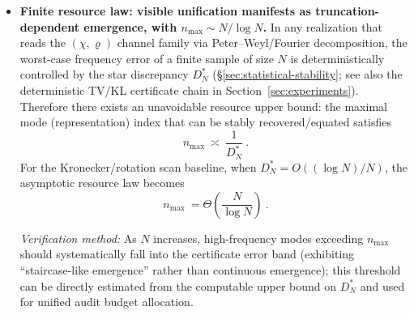 \begin{itemize}
  \item \textbf{Finite resource law: visible unification manifests as truncation-dependent emergence, with \(n_{\max}\sim N/\log N\).}
  In any realization that reads the \((\chi,\varrho)\) channel family via Peter--Weyl/Fourier decomposition, the worst-case frequency error of a finite sample of size \(N\) is deterministically controlled by the star discrepancy \(D_N^*\) (\S\ref{sec:statistical-stability}; see also the deterministic TV/KL certificate chain in Section~\ref{sec:experiments}). Therefore there exists an unavoidable resource upper bound: the maximal mode (representation) index that can be stably recovered/equated satisfies
  \[
  \boxed{\ n_{\max}\ \asymp\ \frac{1}{D_N^*}\ }.
  \]
  For the Kronecker/rotation scan baseline, when \(D_N^*=O((\log N)/N)\), the asymptotic resource law becomes
  \[
  \boxed{\ n_{\max}\ =\Theta\!\left(\frac{N}{\log N}\right)\ }.
  \]
  \par\noindent\emph{Verification method:} As \(N\) increases, high-frequency modes exceeding \(n_{\max}\) should systematically fall into the certificate error band (exhibiting ``staircase-like emergence'' rather than continuous emergence); this threshold can be directly estimated from the computable upper bound on \(D_N^*\) and used for unified audit budget allocation.
\end{itemize}

